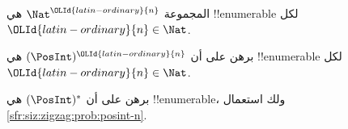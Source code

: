 \documentclass[../../../include/open-logic-section]{subfiles}
\begin{document}
\begin{prop}
المجموعة $\Nat^\OLId{latin-ordinary}{n}$ هي !!{enumerable} لكل $\OLId{latin-ordinary}{n} \in \Nat$.
\end{prop}

\begin{prob}\label{sfr:siz:zigzag:prob:posint-n}
برهن على أن $(\PosInt)^\OLId{latin-ordinary}{n}$ هي !!{enumerable} لكل $\OLId{latin-ordinary}{n} \in \Nat$.
\end{prob}

\begin{prob}\label{sfr:siz:zigzag:prob:posint-star}
  برهن على أن $(\PosInt)^*$ هي !!{enumerable}، ولك استعمال \cref{sfr:siz:zigzag:prob:posint-n}.
\end{prob}
\end{document}
